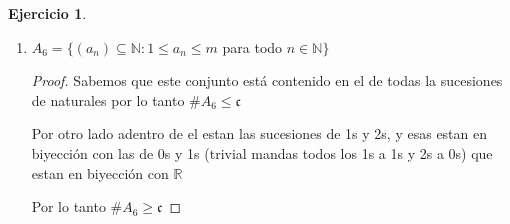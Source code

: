 \documentclass[12pt]{article}
\newcommand{\n}{\aleph_{0}}
\newcommand{\Q}{\mathbb{Q}}
\newcommand{\R}{\mathbb{R}}
\newcommand{\N}{\mathbb{N}}
\newcommand{\ra}{\rightarrow}
\theoremstyle{definition}
\newtheorem{ej}{Ejercicio}
\begin{document}
\begin{ej}
\begin{enumerate}
\begin{proof}
      Ahora consideremos $f: P_{k} \ra \Q^{k}$ dada por $f(a_{n}) = (a_{1}, \dots , a_{k})$ que es sobreyectiva (no es inyectiva por ejemplo la sucesion (1,2,3,1,0,1,0..)va a parar al mismo lugar que la sucesion (1,2,3,7,8,7,8...)

      Entonces $\# P_{k} \geq \# \Q^{k} = \# \N^{k} = \n$

      Y luego tenemos que $$ A_{5} = \bigcup_{k \in \N} P_{k}$$

      Luego $A_{5}$ es unión numerable de contables $\# A_{5} \leq \n$

      Usando las sucesiones $(q,0,0,0..)$ que estan contenidas en $A_n$ vemos que $\# A_5 \geq \n$


    \end{proof} 
  \item $A_{6} = \{(a_{n}) \subseteq \N : 1 \leq a_{n} \leq m$ para todo $ n \in \N\}$
    \begin{proof}

	    Sabemos que este conjunto está contenido en el de todas la sucesiones de naturales por lo tanto $\# A_6 \leq \mathfrak{c}$

	    Por otro lado adentro de el estan las sucesiones de 1s y 2s, y esas estan en biyección con las de 0s y 1s (trivial mandas todos los 1s a 1s y 2s a 0s) que estan en biyección con $\R$

	    Por lo tanto $\# A_6 \geq \mathfrak{c}$
    \end{proof} 

\end{enumerate}
\end{ej}
\end{document}
